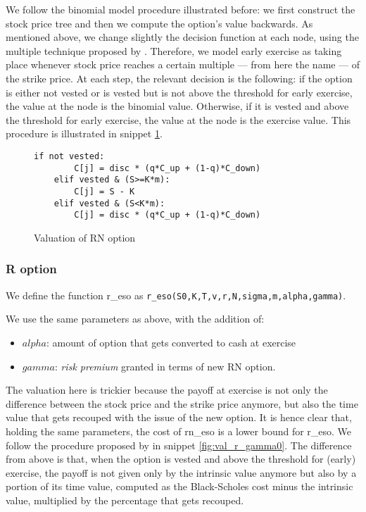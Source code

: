     
We follow the binomial model procedure illustrated before: we first construct the stock price tree and then we compute the option's value backwards. As mentioned above, we change slightly the decision function at each node, using the multiple technique proposed by \cite{hull2004value}. Therefore, we model early exercise as taking place whenever stock price reaches a certain multiple --- from here the name --- of the strike price.
At each step, the relevant decision is the following: if the option is either not vested or is vested but is not above the threshold for early exercise, the value at the node is the binomial value. Otherwise, if it is vested and above the threshold for early exercise, the value at the node is the exercise value. This procedure is illustrated in snippet \ref*{fig:val_rn}.

\begin{figure}[H]
    \begin{lstlisting}[breaklines, basicstyle=\ttfamily\small]
    if not vested: 
        C[j] = disc * (q*C_up + (1-q)*C_down)
    elif vested & (S>=K*m):            
        C[j] = S - K
    elif vested & (S<K*m):
        C[j] = disc * (q*C_up + (1-q)*C_down)
    \end{lstlisting}
    \caption{Valuation of RN option}
 \label{fig:val_rn}
\end{figure}

\subsubsection{R option}
We define the function r\_eso as \verb|r_eso(S0,K,T,v,r,N,sigma,m,alpha,gamma)|.
    


We use the same parameters as above, with the addition of:
\begin{itemize}
    \item $alpha$: amount of option that gets converted to cash at exercise
    \item $gamma$: \textit{risk premium} granted in terms of new RN option. 
\end{itemize}

The valuation here is trickier because the payoff at exercise is not only the difference between the stock price and the strike price anymore, but also the time value that gets recouped with the issue of the new option. It is hence clear that, holding the same parameters, the cost of rn\_eso is a lower bound for r\_eso. We follow the procedure proposed by \cite{huang2013dynamic} in snippet \ref*{fig:val_r_gamma0}. The difference from above is that, when the option is vested and above the threshold for (early) exercise, the payoff is not given only by the intrinsic value anymore but also by a portion of its time value, computed as the Black-Scholes cost minus the intrinsic value, multiplied by the percentage that gets recouped. 


